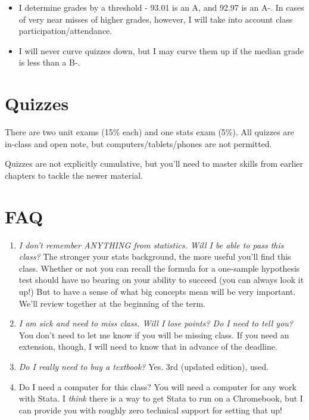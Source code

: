 \documentclass[
]{article}
\begin{document}
\begin{itemize}
\item
  I determine grades by a threshold - 93.01 is an A, and 92.97 is an A-.
  In cases of very near misses of higher grades, however, I will take
  into account class participation/attendance.
\item
  I will never curve quizzes down, but I may curve them up if the median
  grade is less than a B-.
\end{itemize}

\hypertarget{quizzes}{%
\section*{Quizzes}\label{quizzes}}

There are two unit exams (15\% each) and one stats exam (5\%). All
quizzes are in-class and open note, but computers/tablets/phones are not
permitted.

Quizzes are not explicitly cumulative, but you'll need to master skills
from earlier chapters to tackle the newer material.

\hypertarget{frequently-asked-questions}{%
\section*{FAQ}\label{frequently-asked-questions}}

\begin{enumerate}
\def\labelenumi{\arabic{enumi}.}
\item
  \emph{I don't remember ANYTHING from statistics. Will I be able to
  pass this class?} The stronger your stats background, the more useful
  you'll find this class. Whether or not you can recall the formula for
  a one-sample hypothesis test should have no bearing on your ability to
  succeed (you can always look it up!) But to have a sense of what big
  concepts mean will be very important. We'll review together at the
  beginning of the term.
\item
  \emph{I am sick and need to miss class. Will I lose points? Do I need
  to tell you?} You don't need to let me know if you will be missing
  class. If you need an extension, though, I will need to know that in
  advance of the deadline.
\item
  \emph{Do I really need to buy a textbook?} Yes. 3rd (updated edition),
  used.
\item
  Do I need a computer for this class? You will need a computer for any
  work with Stata. I \emph{think} there is a way to get Stata to run on
  a Chromebook, but I can provide you with roughly zero technical
  support for setting that up!
\end{enumerate}
\end{document}
